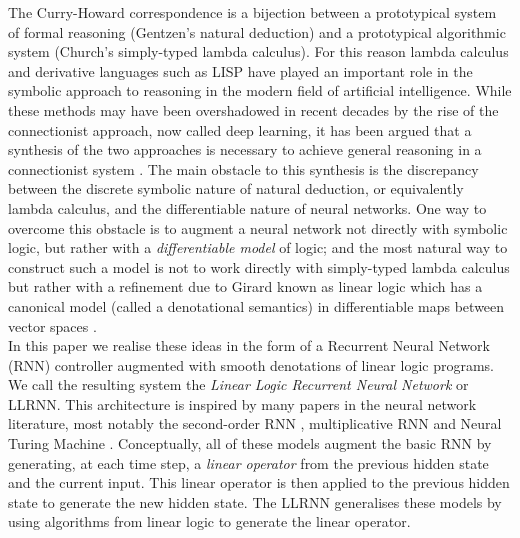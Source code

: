 \documentclass[english,letter paper,12pt,leqno]{article}
\theoremstyle{example}
\numberwithin{equation}{section}
\begin{document}
The Curry-Howard correspondence \cite{sorensen} is a bijection between a prototypical system of formal reasoning (Gentzen's natural deduction) and a prototypical algorithmic system (Church's simply-typed lambda calculus). For this reason lambda calculus and derivative languages such as LISP have played an important role in the symbolic approach to reasoning in the modern field of artificial intelligence. While these methods may have been overshadowed in recent decades by the rise of the connectionist approach, now called deep learning, it has been argued that a synthesis of the two approaches is necessary to achieve general reasoning in a connectionist system \cite{minsky}. The main obstacle to this synthesis is the discrepancy between the discrete symbolic nature of natural deduction, or equivalently lambda calculus, and the differentiable nature of neural networks. One way to overcome this obstacle is to augment a neural network not directly with symbolic logic, but rather with a \emph{differentiable model} of logic; and the most natural way to construct such a model is not to work directly with simply-typed lambda calculus but rather with a refinement due to Girard known as linear logic \cite{girard} which has a canonical model (called a denotational semantics) in differentiable maps between vector spaces \cite{ehrhard-survey,blutecon,murfetclift}. 
\\

In this paper we realise these ideas in the form of a Recurrent Neural Network (RNN) controller \cite{elman} augmented with smooth denotations of linear logic programs. We call the resulting system the \emph{Linear Logic Recurrent Neural Network} or LLRNN. This architecture is inspired by many papers in the neural network literature, most notably the second-order RNN \cite{joulin}, multiplicative RNN \cite{sutskever} and Neural Turing Machine \cite{ntm}. Conceptually, all of these models augment the basic RNN by generating, at each time step, a \emph{linear operator} from the previous hidden state and the current input. This linear operator is then applied to the previous hidden state to generate the new hidden state. The LLRNN generalises these models by using algorithms from linear logic to generate the linear operator.

\end{document}

